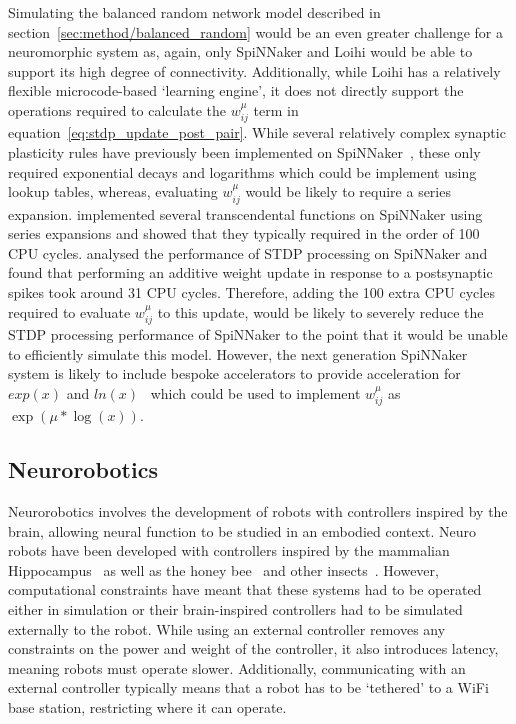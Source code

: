 \documentclass[utf8]{frontiersSCNS} %
\begin{document}
Simulating the balanced random network model described in section~\ref{sec:method/balanced_random} would be an even greater challenge for a neuromorphic system as, again, only SpiNNaker and Loihi would be able to support its high degree of connectivity.
Additionally, while Loihi has a relatively flexible microcode-based `learning engine', it does not directly support the operations required to calculate the $w_{ij}^{\mu}$ term in equation~\ref{eq:stdp_update_post_pair}.
While several relatively complex synaptic plasticity rules have previously been implemented on SpiNNaker~\citep{Knight2016,Mikaitis2018b}, these only required exponential decays and logarithms which could be implement using lookup tables, whereas, evaluating $w_{ij}^{\mu}$ would be likely to require a series expansion.
\citet{Moise2012} implemented several transcendental functions on SpiNNaker using series expansions and showed that they typically required in the order of \num{100} CPU cycles.
\citet{Knight2016b} analysed the performance of STDP processing on SpiNNaker and found that performing an additive weight update in response to a postsynaptic spikes took around \num{31} CPU cycles.
Therefore, adding the \num{100} extra CPU cycles required to evaluate $w_{ij}^{\mu}$ to this update, would be likely to severely reduce the STDP processing performance of SpiNNaker to the point that it would be unable to efficiently simulate this model.
However, the next generation SpiNNaker system is likely to include bespoke accelerators to provide acceleration for $exp(x)$ and $ln(x)$~\citep{Mikaitis2018,Partzsch2017} which could be used to implement $w_{ij}^{\mu}$ as $\exp(\mu * \log(x))$.

\subsection{Neurorobotics}
\label{sec:discussion/neurobotics}
Neurorobotics involves the development of robots with controllers inspired by the brain, allowing neural function to be studied in an embodied context.
Neuro robots have been developed with controllers inspired by the mammalian Hippocampus~\citep{Krichmar2005} as well as the honey bee~\citep{Cope2016} and other insects~\citep{Blanchard2000}.
However, computational constraints have meant that these systems had to be operated either in simulation or their brain-inspired controllers had to be simulated externally to the robot.
While using an external controller removes any constraints on the power and weight of the controller, it also introduces latency, meaning robots must operate slower.
Additionally, communicating with an external controller typically means that a robot has to be `tethered' to a WiFi base station, restricting where it can operate.
\end{document}
